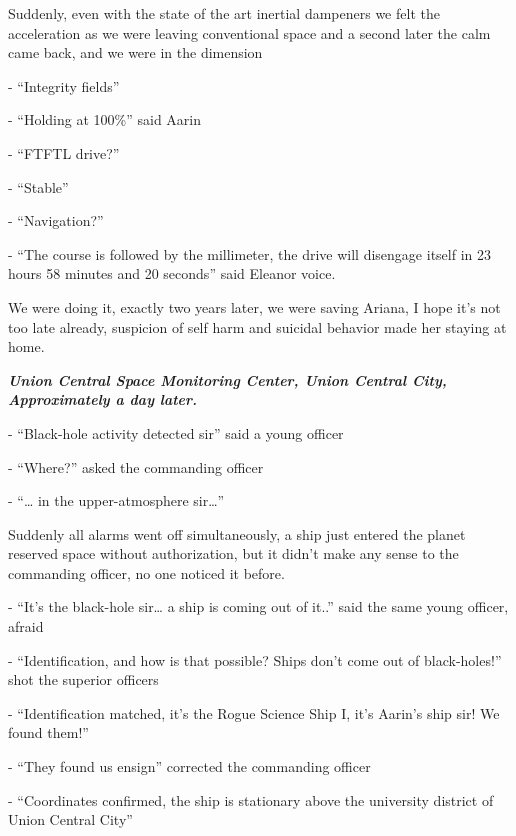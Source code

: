 \documentclass[colorlinks,12pt,a4paper]{book}
\begin{document}
 Suddenly, even with the state of the art inertial dampeners we felt the acceleration as we were leaving conventional 
 space and a second later the calm came back, and we were in the dimension\par
 \bigskip
 
 - “Integrity fields”\par
 \bigskip
 - “Holding at 100\%” said Aarin\par
 \bigskip
 - “FTFTL drive?”\par
 \bigskip
 - “Stable”\par
 \bigskip
 - “Navigation?”\par
 \bigskip
 - “The course is followed by the millimeter, the drive will disengage itself in 23 hours 58 minutes and 20 seconds”
  said Eleanor voice.\par
  \bigskip
 
 We were doing it, exactly two years later, we were saving Ariana, I hope it's not too late already, suspicion of self 
 harm and suicidal behavior made her staying at home.\par
 \bigskip
 
 \textit{\textbf{Union Central Space Monitoring Center, Union Central City, Approximately a day later.}}\par
 \bigskip
 
 - “Black-hole activity detected sir” said a young officer\par
 \bigskip
 - “Where?” asked the commanding officer\par
 \bigskip
 - “… in the upper-atmosphere sir…”\par
 \bigskip
 
 Suddenly all alarms went off simultaneously, a ship just entered the planet reserved space without authorization, 
 but it didn't make any sense to the commanding officer, no one noticed it before.\par
 \bigskip
 
 - “It's the black-hole sir… a ship is coming out of it..” said the same young officer, afraid\par
 \bigskip
 - “Identification, and how is that possible? Ships don't come out of black-holes!” shot the superior officers\par
 \bigskip
 - “Identification matched, it's the Rogue Science Ship I, it's Aarin's ship sir! We found them!”\par
 \bigskip
 - “They found us ensign” corrected the commanding officer\par
 \bigskip
 - “Coordinates confirmed, the ship is stationary above the university district of Union Central City”\par
 \bigskip
 
\end{document}
